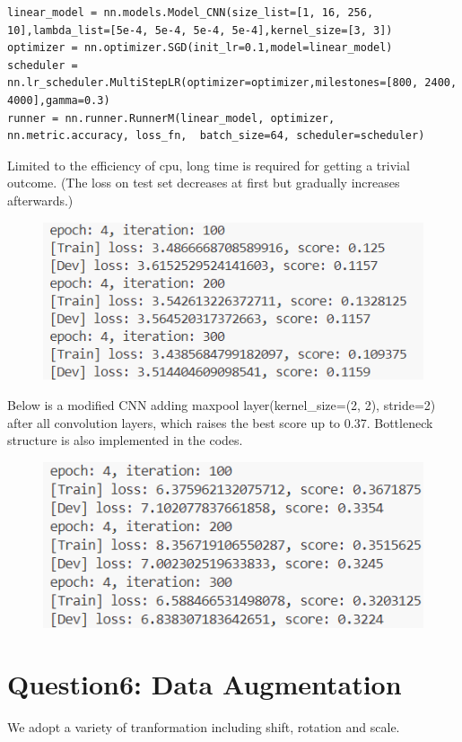 \documentclass[]{article}
\begin{document}
\begin{lstlisting}
linear_model = nn.models.Model_CNN(size_list=[1, 16, 256, 10],lambda_list=[5e-4, 5e-4, 5e-4, 5e-4],kernel_size=[3, 3])
optimizer = nn.optimizer.SGD(init_lr=0.1,model=linear_model)
scheduler = nn.lr_scheduler.MultiStepLR(optimizer=optimizer,milestones=[800, 2400, 4000],gamma=0.3)
runner = nn.runner.RunnerM(linear_model, optimizer, nn.metric.accuracy, loss_fn,  batch_size=64, scheduler=scheduler)
\end{lstlisting}

Limited to the efficiency of cpu, long time is required for getting a trivial outcome. (The loss on test set decreases at first but gradually increases afterwards.)

\begin{figure}[H]
	\centering
	\includegraphics[width=0.7\linewidth]{Q5}
	\caption{}
	\label{fig:q5}
\end{figure}

Below is a modified CNN adding maxpool layer(kernel\_size=(2, 2), stride=2) after all convolution layers, which raises the best score up to 0.37. Bottleneck structure is also implemented in the codes.

\begin{figure}[H]
	\centering
	\includegraphics[width=0.7\linewidth]{Q5_2}
	\caption{}
	\label{fig:q52}
\end{figure}

\section{Question6: Data Augmentation}
We adopt a variety of tranformation including shift, rotation and scale.
\end{document}

